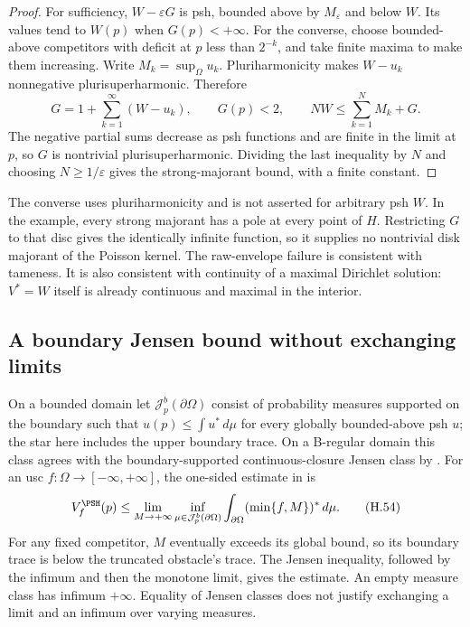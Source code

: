 \begin{proof}
For sufficiency, $W-\varepsilon G$ is psh, bounded above by
$M_\varepsilon$ and below $W$. Its values tend to $W(p)$ when
$G(p)<+\infty$.
For the converse, choose bounded-above competitors with deficit at $p$
less than $2^{-k}$, and take finite maxima to make them increasing.
Write $M_k=\sup_\Omega u_k$. Pluriharmonicity makes $W-u_k$
nonnegative plurisuperharmonic. Therefore
\begin{equation*}
 G=1+\sum_{k=1}^\infty(W-u_k),\qquad
 G(p)<2,\qquad NW\leq\sum_{k=1}^NM_k+G.
\tag{H.53}\label{eq:appH-majorant-deficit-sum}
\end{equation*}
The negative partial sums decrease as psh functions and are finite in
the limit at $p$, so $G$ is nontrivial plurisuperharmonic. Dividing
the last inequality by $N$ and choosing $N\geq1/\varepsilon$ gives
the strong-majorant bound, with a finite constant.
\end{proof}

The converse uses pluriharmonicity and is not asserted for arbitrary psh
$W$. In the example, every strong majorant has a pole at every point
of $H$. Restricting $G$ to that disc gives the identically infinite
function, so it supplies no nontrivial disk majorant of the Poisson kernel.
The raw-envelope failure is consistent with tameness. It is also consistent
with continuity of a maximal Dirichlet solution: $V^*=W$ itself is already
continuous and maximal in the interior.

\subsection{A boundary Jensen bound without exchanging limits}
\label{sec:appH-restricted-Jensen-bound}

On a bounded domain let $\mathcal J_p^b(\partial\Omega)$ consist of
probability measures supported on the boundary such that
$u(p)\leq\int u^*\,d\mu$ for every globally bounded-above psh $u$;
the star here includes the upper boundary trace. On a B-regular domain
this class agrees with the boundary-supported continuous-closure Jensen
class by \cite[Corollary~4.3, printed p.~192]{Wikstrom01JensenPublished}.
For an usc $f:\Omega\to[-\infty,+\infty]$, the one-sided estimate in
\cite[Proposition~3.2]{Wikstrom26BoundedMinorantsV2} is
\begin{equation*}
 V_f^{\PSH}(p)\leq
 \lim_{M\to+\infty}\inf_{\mu\in\mathcal J_p^b(\partial\Omega)}
              \int_{\partial\Omega}(\min\{f,M\})^*\,d\mu.
\tag{H.54}\label{eq:appH-restricted-Jensen-bound}
\end{equation*}
For any fixed competitor, $M$ eventually exceeds its global bound,
so its boundary trace is below the truncated obstacle's trace.
The Jensen inequality, followed by the infimum and then the monotone
limit, gives the estimate. An empty measure class has infimum $+\infty$.
Equality of Jensen classes does not justify exchanging a limit and an
infimum over varying measures.

